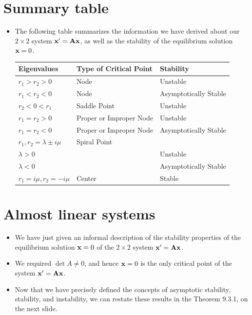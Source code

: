 \documentclass[11pt,a4paper]{article}
\begin{document}
	\section*{Summary table}
	\begin{itemize}
		\item The following table summarizes the information we have derived about our $2 \times 2$ system $\vb{x}^\prime = \vb{Ax}$, as well as the stability of the equilibrium solution $\vb{x} = 0$.
		\begin{table}[H]
			\centering
			\begin{tabular}{ |l|l|l| } 
			 \hline
			 \textbf{Eigenvalues} & \textbf{Type of Critical Point} & \textbf{Stability}\\
			 \hline
			 $r_1>r_2>0$ & Node & Unstable \\
			 \hline
			 $r_1 < r_2 < 0$ & Node & Asymptotically Stable \\
			 \hline
			 $r_2 < 0 < r_1$ & Saddle Point & Unstable \\ 
			 \hline
			 $r_1 = r_2 > 0$ & Proper or Improper Node & Unstable \\
			 \hline
			 $r_1 = r_2 < 0$ & Proper or Improper Node & Asymptotically Stable \\
			 \hline
			 $r_1,r_2 = \lambda \pm i\mu$ & Spiral Point &  \\
			 \hline
			 $\lambda > 0$ &  & Unstable \\
			 \hline
			 $\lambda < 0$ &  & Asymptotically Stable \\
			 \hline
			 $r_1 = i\mu, r_2 = -i\mu$ & Center & Stable \\
			 \hline
			\end{tabular}
		\end{table}
	\end{itemize}
	\section*{Almost linear systems}
	\begin{itemize}
		\item We have just given an informal description of the stability properties of the equilibrium solution $\vb{x} = 0$ of the $2 \times 2$ system $\vb{x}^\prime = \vb{Ax}$.
		\item We required $\det A \neq 0$, and hence $\vb{x} = 0$ is the only critical point of the system $\vb{x}^\prime = \vb{Ax}$.
		\item Now that we have precisely defined the concepts of asymptotic stability, stability, and instability, we can restate these results in the Theorem 9.3.1, on the next slide.
	\end{itemize}
\end{document}
